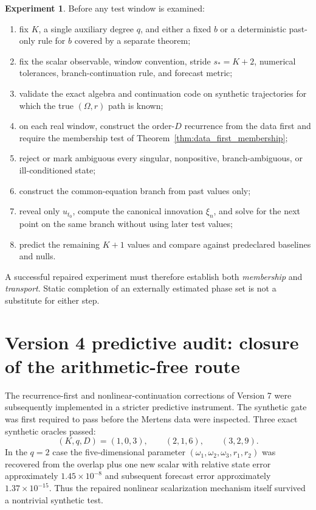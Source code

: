 \documentclass[11pt]{amsart}
\numberwithin{equation}{section}
\theoremstyle{plain}
\theoremstyle{definition}
\newtheorem{experiment}[theorem]{Experiment}
\theoremstyle{remark}
\begin{document}
\begin{experiment}
\label{exp:repaired_causal_protocol}
Before any test window is examined:
\begin{enumerate}
\item fix $K$, a single auxiliary degree $q$, and either a fixed $b$ or a deterministic past-only rule for $b$ covered by a separate theorem;
\item fix the scalar observable, window convention, stride $s_*=K+2$, numerical tolerances, branch-continuation rule, and forecast metric;
\item validate the exact algebra and continuation code on synthetic trajectories for which the true $(\Omega,r)$ path is known;
\item on each real window, construct the order-$D$ recurrence from the data first and require the membership test of Theorem~\ref{thm:data_first_membership};
\item reject or mark ambiguous every singular, nonpositive, branch-ambiguous, or ill-conditioned state;
\item construct the common-equation branch from past values only;
\item reveal only $u_{t_0}$, compute the canonical innovation $\xi_n$, and solve for the next point on the same branch without using later test values;
\item predict the remaining $K+1$ values and compare against predeclared baselines and nulls.
\end{enumerate}
\end{experiment}

A successful repaired experiment must therefore establish both \emph{membership} and \emph{transport}. Static completion of an externally estimated phase set is not a substitute for either step.


\section{Version 4 predictive audit: closure of the arithmetic-free route}
\label{sec:v4_closure}

The recurrence-first and nonlinear-continuation corrections of Version 7 were subsequently
implemented in a stricter predictive instrument.  The synthetic gate was first required to pass
before the Mertens data were inspected.  Three exact synthetic oracles passed:
\[
(K,q,D)=(1,0,3),\qquad (2,1,6),\qquad (3,2,9).
\]
In the $q=2$ case the five-dimensional parameter
$(\omega_1,\omega_2,\omega_3,r_1,r_2)$ was recovered from the overlap plus one new scalar with
relative state error approximately $1.45\times10^{-8}$ and subsequent forecast error
approximately $1.37\times10^{-15}$.  Thus the repaired nonlinear scalarization mechanism itself
survived a nontrivial synthetic test.
\end{document}
